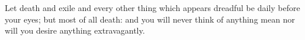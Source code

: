 Let  death and  exile and  every other  thing which  appears dreadful  be daily
before your eyes; but  most of all death: and you will  never think of anything
mean nor will you desire anything extravagantly.
